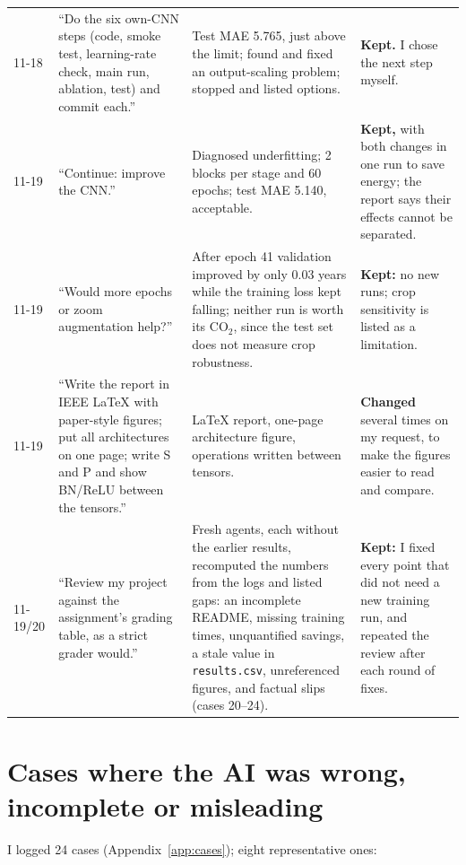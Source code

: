 \documentclass[10pt,a4paper]{article}
\newcommand{\cotwo}{CO$_2$}
\begin{document}
\begin{longtable}{@{}p{1.2cm}p{4.3cm}p{5.9cm}p{4.7cm}@{}}
11-18 & ``Do the six own-CNN steps (code, smoke test, learning-rate check, main run, ablation, test) and commit each.'' & Test MAE 5.765, just above the limit; found and fixed an output-scaling problem; stopped and listed options. & \textbf{Kept.} I chose the next step myself. \\
11-19 & ``Continue: improve the CNN.'' & Diagnosed underfitting; 2 blocks per stage and 60 epochs; test MAE 5.140, acceptable. & \textbf{Kept,} with both changes in one run to save energy; the report says their effects cannot be separated. \\
11-19 & ``Would more epochs or zoom augmentation help?'' & After epoch 41 validation improved by only 0.03 years while the training loss kept falling; neither run is worth its \cotwo{}, since the test set does not measure crop robustness. & \textbf{Kept:} no new runs; crop sensitivity is listed as a limitation. \\
11-19 & ``Write the report in IEEE \LaTeX{} with paper-style figures; put all architectures on one page; write S and P and show BN/ReLU between the tensors.'' & \LaTeX{} report, one-page architecture figure, operations written between tensors. & \textbf{Changed} several times on my request, to make the figures easier to read and compare. \\
11-19/20 & ``Review my project against the assignment's grading table, as a strict grader would.'' & Fresh agents, each without the earlier results, recomputed the numbers from the logs and listed gaps: an incomplete README, missing training times, unquantified savings, a stale value in \texttt{results.csv}, unreferenced figures, and factual slips (cases 20--24). & \textbf{Kept:} I fixed every point that did not need a new training run, and repeated the review after each round of fixes. \\
\bottomrule
\end{longtable}

\section{Cases where the AI was wrong, incomplete or misleading}
I logged 24 cases (Appendix~\ref{app:cases}); eight representative ones:
\end{document}
